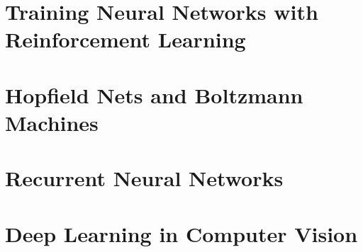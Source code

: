 \documentclass[fleqn,10pt]{SelfArx} %
\begin{document}
\section{Training Neural Networks with Reinforcement Learning}
\section{Hopfield Nets and Boltzmann Machines}
\section{Recurrent Neural Networks}
\section{Deep Learning in Computer Vision}





\end{document}
